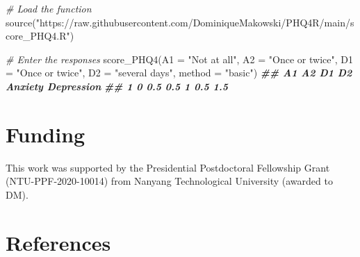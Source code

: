 \documentclass[
  man,floatsintext]{apa6}
\newenvironment{Shaded}{\begin{snugshade}}{\end{snugshade}}
\newcommand{\AttributeTok}[1]{\textcolor[rgb]{0.77,0.63,0.00}{#1}}
\newcommand{\CommentTok}[1]{\textcolor[rgb]{0.56,0.35,0.01}{\textit{#1}}}
\newcommand{\DocumentationTok}[1]{\textcolor[rgb]{0.56,0.35,0.01}{\textbf{\textit{#1}}}}
\newcommand{\FunctionTok}[1]{\textcolor[rgb]{0.00,0.00,0.00}{#1}}
\newcommand{\NormalTok}[1]{#1}
\newcommand{\StringTok}[1]{\textcolor[rgb]{0.31,0.60,0.02}{#1}}
\begin{document}
\begin{Shaded}
\begin{Highlighting}[]
\CommentTok{\# Load the function}
\FunctionTok{source}\NormalTok{(}\StringTok{"https://raw.githubusercontent.com/DominiqueMakowski/PHQ4R/main/score\_PHQ4.R"}\NormalTok{)}

\CommentTok{\# Enter the responses}
\FunctionTok{score\_PHQ4}\NormalTok{(}\AttributeTok{A1 =} \StringTok{"Not at all"}\NormalTok{, }\AttributeTok{A2 =} \StringTok{"Once or twice"}\NormalTok{,}
           \AttributeTok{D1 =} \StringTok{"Once or twice"}\NormalTok{, }\AttributeTok{D2 =} \StringTok{"several days"}\NormalTok{,}
           \AttributeTok{method =} \StringTok{"basic"}\NormalTok{)}
\DocumentationTok{\#\#   A1  A2  D1 D2 Anxiety Depression}
\DocumentationTok{\#\# 1  0 0.5 0.5  1     0.5        1.5}
\end{Highlighting}
\end{Shaded}

\hypertarget{funding}{%
\section{Funding}\label{funding}}

This work was supported by the
Presidential Postdoctoral Fellowship Grant (NTU-PPF-2020-10014) from Nanyang Technological University (awarded to DM).

\newpage

\hypertarget{references}{%
\section{References}\label{references}}
\end{document}
